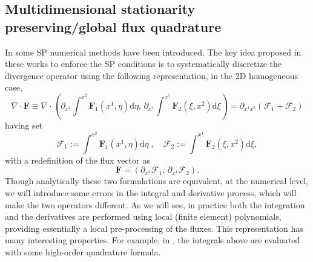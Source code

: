 \documentclass[a4paper,10pt]{article}
\begin{document}
\subsection{Multidimensional stationarity preserving/global flux quadrature}\label{sec:multid_GF}

In \cite{barsukow2025structure,barsukow2025stationaritypreservingnodalfinite,barsukow2025genuinely} some SP numerical methods have been introduced.
The key idea   proposed in these works to enforce the SP conditions 
is  to  systematically discretize  the divergence operator using  the following representation, in the 2D homogeneous case,  
\begin{equation}\label{eq:GF0}
\nabla\cdot  \mathbf{F} \equiv   \nabla\cdot \left( \partial_{x^2}\int^{x^2} \mathbf{F}_1(x^1,\eta)\mathrm{d}\eta,\, \partial_{x^1}\int^{x^1} \mathbf{F}_2(\xi,x^2)\mathrm{d}\xi \right) = \partial_{x^1 x^2} (\mathcal{F}_1 +\mathcal{F}_2)
\end{equation}
having set
\begin{equation}\label{eq:GF1}
\mathcal{F}_1:= \int^{x^2} \mathbf{F}_1(x^1,\eta)\mathrm{d}\eta\;,\quad \mathcal{F}_2:= \int^{x^1} \mathbf{F}_2(\xi,x^2)\mathrm{d}\xi,
\end{equation}
with a redefinition of the   flux vector  as  
\begin{equation}\label{eq:GF0a}
 \mathbf{F} = \left( \partial_{x^2}\mathcal{F}_1,\, \partial_{x^1} \mathcal{F}_2\right) .
\end{equation}
Though analytically these two formulations are equivalent, at the numerical level, we will introduce some errors in the integral and derivative process, which will make the two operators different. As we will see, in practice both the integration and the derivatives are performed using local 
(finite element) polynomials, providing essentially a local pre-processing of the fluxes. This representation has many interesting properties.
For example, in \cite{barsukow2025structure}, the integrals above are evaluated with some high-order quadrature formula. 
\end{document}
